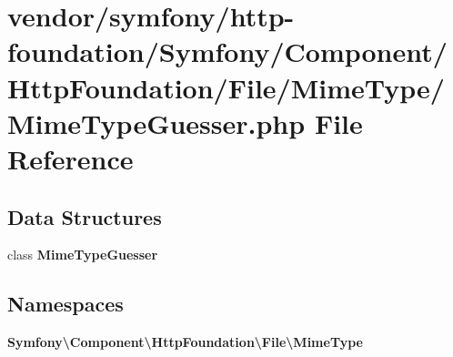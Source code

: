 \section{vendor/symfony/http-\/foundation/\+Symfony/\+Component/\+Http\+Foundation/\+File/\+Mime\+Type/\+Mime\+Type\+Guesser.php File Reference}
\label{_mime_type_guesser_8php}
\subsection*{Data Structures}
\begin{DoxyCompactItemize}
\item 
class {\bf Mime\+Type\+Guesser}
\end{DoxyCompactItemize}
\subsection*{Namespaces}
\begin{DoxyCompactItemize}
\item 
 {\bf Symfony\textbackslash{}\+Component\textbackslash{}\+Http\+Foundation\textbackslash{}\+File\textbackslash{}\+Mime\+Type}
\end{DoxyCompactItemize}
